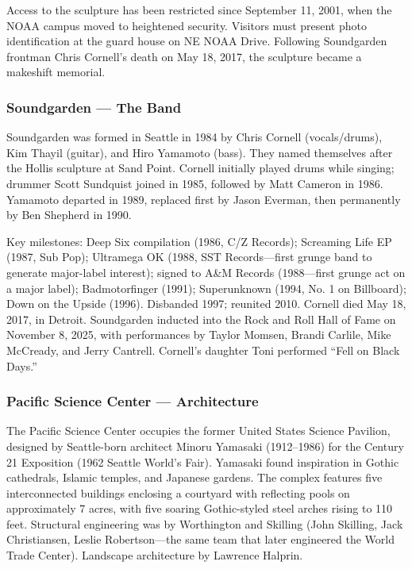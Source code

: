 \documentclass[11pt,letterpaper]{article}
\begin{document}
Access to the sculpture has been restricted since September 11, 2001, when the NOAA campus moved to heightened security. Visitors must present photo identification at the guard house on NE NOAA Drive. Following Soundgarden frontman Chris Cornell's death on May 18, 2017, the sculpture became a makeshift memorial.

\subsubsection{Soundgarden — The Band}
Soundgarden was formed in Seattle in 1984 by Chris Cornell (vocals/drums), Kim Thayil (guitar), and Hiro Yamamoto (bass). They named themselves after the Hollis sculpture at Sand Point. Cornell initially played drums while singing; drummer Scott Sundquist joined in 1985, followed by Matt Cameron in 1986. Yamamoto departed in 1989, replaced first by Jason Everman, then permanently by Ben Shepherd in 1990.

Key milestones: Deep Six compilation (1986, C/Z Records); Screaming Life EP (1987, Sub Pop); Ultramega OK (1988, SST Records---first grunge band to generate major-label interest); signed to A\&M Records (1988---first grunge act on a major label); Badmotorfinger (1991); Superunknown (1994, No. 1 on Billboard); Down on the Upside (1996). Disbanded 1997; reunited 2010. Cornell died May 18, 2017, in Detroit. Soundgarden inducted into the Rock and Roll Hall of Fame on November 8, 2025, with performances by Taylor Momsen, Brandi Carlile, Mike McCready, and Jerry Cantrell. Cornell's daughter Toni performed ``Fell on Black Days.''

\subsubsection{Pacific Science Center — Architecture}
The Pacific Science Center occupies the former United States Science Pavilion, designed by Seattle-born architect Minoru Yamasaki (1912--1986) for the Century 21 Exposition (1962 Seattle World's Fair). Yamasaki found inspiration in Gothic cathedrals, Islamic temples, and Japanese gardens. The complex features five interconnected buildings enclosing a courtyard with reflecting pools on approximately 7 acres, with five soaring Gothic-styled steel arches rising to 110 feet. Structural engineering was by Worthington and Skilling (John Skilling, Jack Christiansen, Leslie Robertson---the same team that later engineered the World Trade Center). Landscape architecture by Lawrence Halprin.
\end{document}
